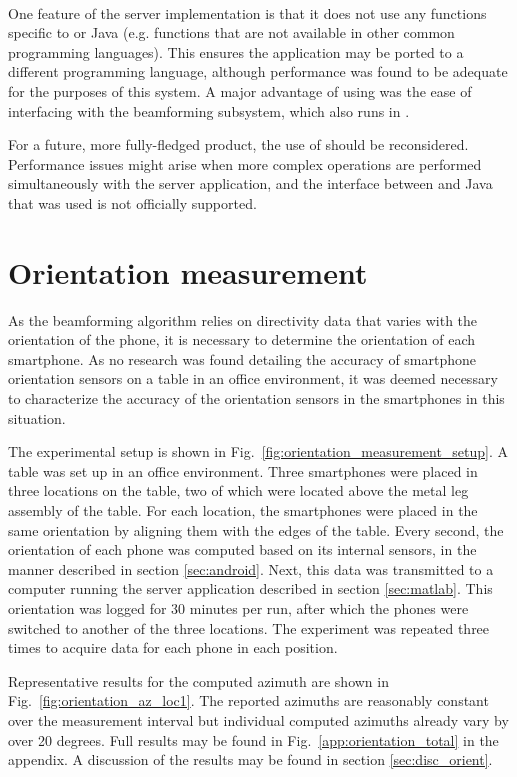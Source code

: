 \documentclass[a4paper, notitlepage]{report}
\begin{document}
\paragraph*{}
One feature of the server implementation is that it does not use any functions specific to \matlab or Java (e.g. functions that are not available in other common programming languages). This ensures the application may be ported to a different programming language, although performance was found to be adequate for the purposes of this system. A major advantage of using \matlab was the ease of interfacing with the beamforming subsystem, which also runs in \matlab \cite{BAP:ErikNiels}.

For a future, more fully-fledged product, the use of \matlab should be reconsidered. Performance issues might arise when more complex operations are performed simultaneously with the server application, and the interface between \matlab and Java that was used is not officially supported.

\section{Orientation measurement}
\label{sec:orientation_measurement}
As the beamforming algorithm relies on directivity data that varies with the orientation of the phone, it is necessary to determine the orientation of each smartphone. As no research was found detailing the accuracy of smartphone orientation sensors on a table in an office environment, it was deemed necessary to characterize the accuracy of the orientation sensors in the smartphones in this situation.

The experimental setup is shown in Fig.~\ref{fig:orientation_measurement_setup}. A table was set up in an office environment. Three smartphones were placed in three locations on the table, two of which were located above the metal leg assembly of the table. For each location, the smartphones were placed in the same orientation by aligning them with the edges of the table. Every second, the orientation of each phone was computed based on its internal sensors, in the manner described in section \ref{sec:android}. Next, this data was transmitted to a computer running the server application described in section \ref{sec:matlab}. This orientation was logged for 30 minutes per run, after which the phones were switched to another of the three locations. The experiment was repeated three times to acquire data for each phone in each position.

Representative results for the computed azimuth are shown in Fig.~\ref{fig:orientation_az_loc1}. The reported azimuths are reasonably constant over the measurement interval but individual computed azimuths already vary by over 20 degrees. Full results may be found in Fig.~\ref{app:orientation_total} in the appendix. A discussion of the results may be found in section \ref{sec:disc_orient}.
\end{document}
